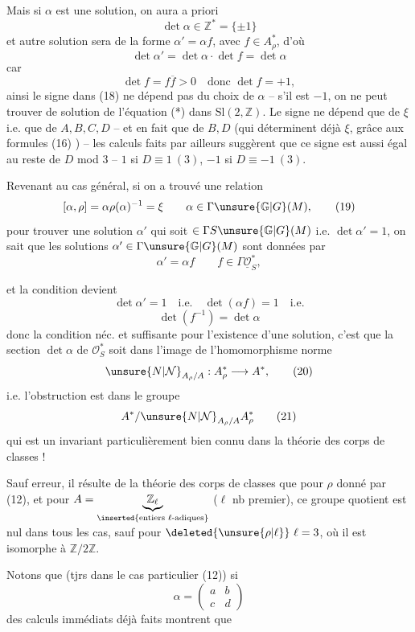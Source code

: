 

Mais si $\alpha$ est une solution, on aura a priori
\[
\det\alpha\in\mathbb Z^*=\{\pm1\}
\tag{18}
\]
et  autre solution sera de la forme
$\alpha'=\alpha f$, avec $f\in A_\rho^*$, d'où
\[
\det\alpha'=\det\alpha\cdot\det f=\det\alpha
\]
car
\[
\det f=f\overline f>0\quad\text{donc }\det f=+1,
\]
ainsi le signe dans (18)  ne dépend pas
du choix de $\alpha$ -- s'il est $-1$, on ne peut
trouver de solution de l'équation (*) dans
$\mathrm{Sl}(2,\mathbb Z)$. Le signe ne dépend que de $\xi$ i.e. que
de $A,B,C,D$ -- et en fait  que de $B,D$
(qui déterminent déjà $\xi$, grâce aux
formules (16) ) -- les calculs faits par ailleurs
suggèrent que ce signe est aussi  égal au
reste de $D$ mod 3 -- $1$ si $D\equiv1\ (3)$, $-1$ si
$D\equiv-1\ (3)$.

Revenant au cas général, si on a trouvé
une relation
\[
[\alpha,\rho]=\alpha\rho(\alpha)^{-1}=\xi
\qquad\alpha\in\Gamma\unsure{\mathbb G|G}(M),
\tag{19}
\]
pour  trouver une solution $\alpha'$ qui
soit $\in\Gamma S\unsure{\mathbb G|G}(M)$ i.e. $\det\alpha'=1$, on sait que
les solutions $\alpha'\in\Gamma\unsure{\mathbb G|G}(M)$  sont données par
\[
\alpha'=\alpha f\qquad f\in\Gamma\underline{\mathcal O}_S^*,
\]



et la condition devient
\[
\det\alpha'=1\quad\text{i.e.}\quad\det(\alpha f)=1\quad\text{i.e.}
\]
\[
\det(f^{-1})=\det\alpha
\]
donc la condition néc. et suffisante pour l'existence
d'une solution, c'est que la section $\det\alpha$ de
$\mathcal O_S^*$ soit dans l'image de l'homomorphisme
norme
\[
\unsure{N|\mathcal N}_{A_\rho/A}:A_\rho^*\longrightarrow A^*,
\tag{20}
\]
i.e. l'obstruction est dans le groupe
\[
A^*/\unsure{N|\mathcal N}_{A_\rho/A}A_\rho^*
\tag{21}
\]
qui est un invariant particulièrement bien
connu dans la théorie des corps de classes !

Sauf erreur, il résulte de la théorie des corps
de classes que pour $\rho$ donné par (12),
et pour $A=\underbrace{\mathbb Z_\ell}_{\inserted{\text{entiers }\ell\text{-adiques}}}$ ($\ell$ nb premier), ce
groupe quotient est nul dans tous les cas,
sauf pour $\deleted{\unsure{\rho|\ell}}\ \ell=3$, où il est isomorphe à
$\mathbb Z/2\mathbb Z$. 

Notons que (tjrs dans le cas particulier (12))
si
\[
\alpha=\begin{pmatrix}a&b\\c&d\end{pmatrix}
\tag{22}
\]
des calculs immédiats déjà faits montrent que

